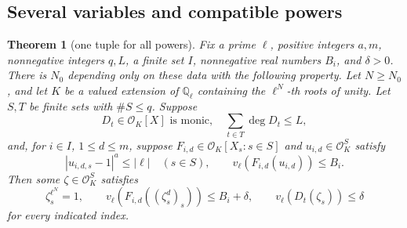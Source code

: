 \documentclass[11pt,a4paper]{article}
\newtheorem{theorem}{Theorem}[section]
\theoremstyle{definition}
\newcommand{\Q}{\mathbb Q}
\newcommand{\abs}[1]{\left|#1\right|}
\begin{document}
\subsection{Several variables and compatible powers}
\begin{theorem}[one tuple for all powers]\label{thm:many-torsion}
Fix a prime \(\ell\), positive integers \(a,m\), nonnegative integers \(q,L\),
a finite set \(I\), nonnegative real numbers \(B_i\), and \(\delta>0\).
There is \(N_0\) depending only on these data with the following property.
Let \(N\ge N_0\), and let \(K\) be a valued extension of \(\Q_\ell\) containing
the \(\ell^N\)-th roots of unity. Let \(S,T\) be finite sets with \(\#S\le q\).
Suppose
\[
 D_t\in\mathcal O_K[X]\text{ is monic},\quad
 \sum_{t\in T}\deg D_t\le L,
\]
and, for \(i\in I\), \(1\le d\le m\), suppose
\(F_{i,d}\in\mathcal O_K[X_s:s\in S]\) and
\(u_{i,d}\in\mathcal O_K^S\) satisfy
\[
 \abs{u_{i,d,s}-1}^{a}\le\abs\ell\quad(s\in S),
 \qquad v_\ell(F_{i,d}(u_{i,d}))\le B_i .
\]
Then some \(\zeta\in\mathcal O_K^S\) satisfies
\[
 \zeta_s^{\ell^N}=1,\qquad
 v_\ell(F_{i,d}((\zeta_s^d)_s))\le B_i+\delta,\qquad
 v_\ell(D_t(\zeta_s))\le\delta
\]
for every indicated index.
\end{theorem}
\end{document}
